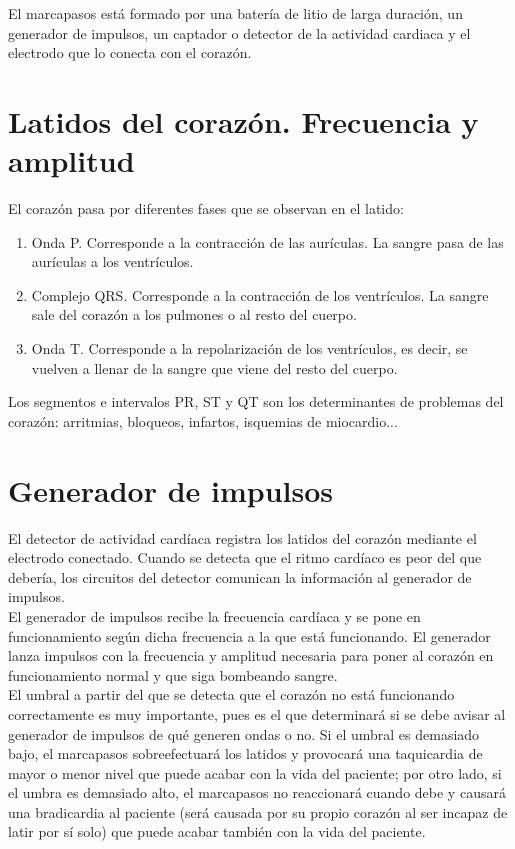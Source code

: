 \documentclass[11pt,a4paper]{article}
\begin{document}
El marcapasos está formado por una batería de litio de larga duración, un generador de impulsos, un captador o detector de la actividad cardiaca y el electrodo que lo conecta con el corazón.\\

\section{Latidos del corazón. Frecuencia y amplitud}

El corazón pasa por diferentes fases que se observan en el latido:

\begin{enumerate}
	\item Onda P. Corresponde a la contracción de las aurículas. La sangre pasa de las aurículas a los ventrículos.
	\item Complejo QRS. Corresponde a la contracción de los ventrículos. La sangre sale del corazón a los pulmones o al resto del cuerpo.
	\item Onda T. Corresponde a la repolarización de los ventrículos, es decir, se vuelven a llenar de la sangre que viene del resto del cuerpo.
\end{enumerate}

Los segmentos e intervalos PR, ST y QT son los determinantes de problemas del corazón: arritmias, bloqueos, infartos, isquemias de miocardio...

\section{Generador de impulsos}

El detector de actividad cardíaca registra los latidos del corazón mediante el electrodo conectado. Cuando se detecta que el ritmo cardíaco es peor del que debería, los circuitos del detector comunican la información al generador de impulsos.\\

El generador de impulsos recibe la frecuencia cardíaca y se pone en funcionamiento según dicha frecuencia a la que está funcionando. El generador lanza impulsos con la frecuencia y amplitud necesaria para poner al corazón en funcionamiento normal y que siga bombeando sangre.\\

El umbral a partir del que se detecta que el corazón no está funcionando correctamente es muy importante, pues es el que determinará si se debe avisar al generador de impulsos de qué generen ondas o no. Si el umbral es demasiado bajo, el marcapasos sobreefectuará los latidos y provocará una taquicardia de mayor o menor nivel que puede acabar con la vida del paciente; por otro lado, si el umbra es demasiado alto, el marcapasos no reaccionará cuando debe y causará una bradicardia al paciente (será causada por su propio corazón al ser incapaz de latir por sí solo) que puede acabar también con la vida del paciente.\\
\end{document}
